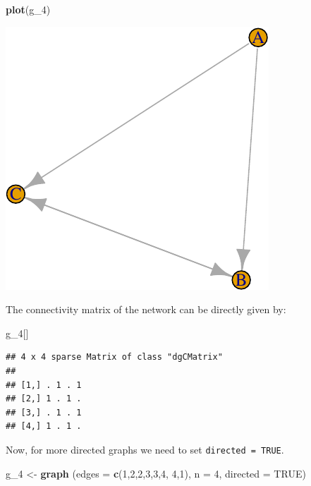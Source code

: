 \documentclass[]{article}
\newenvironment{Shaded}{\begin{snugshade}}{\end{snugshade}}
\newcommand{\KeywordTok}[1]{\textcolor[rgb]{0.13,0.29,0.53}{\textbf{{#1}}}}
\newcommand{\DataTypeTok}[1]{\textcolor[rgb]{0.13,0.29,0.53}{{#1}}}
\newcommand{\DecValTok}[1]{\textcolor[rgb]{0.00,0.00,0.81}{{#1}}}
\newcommand{\StringTok}[1]{\textcolor[rgb]{0.31,0.60,0.02}{{#1}}}
\newcommand{\OtherTok}[1]{\textcolor[rgb]{0.56,0.35,0.01}{{#1}}}
\newcommand{\NormalTok}[1]{{#1}}
\begin{document}
\begin{Shaded}
\begin{Highlighting}[]
\KeywordTok{plot}\NormalTok{(g_4)}
\end{Highlighting}
\end{Shaded}

\includegraphics{ResearchTools_files/figure-latex/unnamed-chunk-40-1.pdf}

The connectivity matrix of the network can be directly given by:

\begin{Shaded}
\begin{Highlighting}[]
\NormalTok{g_4[]}
\end{Highlighting}
\end{Shaded}

\begin{verbatim}
## 4 x 4 sparse Matrix of class "dgCMatrix"
##             
## [1,] . 1 . 1
## [2,] 1 . 1 .
## [3,] . 1 . 1
## [4,] 1 . 1 .
\end{verbatim}

Now, for more directed graphs we need to set \texttt{directed\ =\ TRUE}.

\begin{Shaded}
\begin{Highlighting}[]
\NormalTok{g_4 <-}\StringTok{ }\KeywordTok{graph} \NormalTok{(}\DataTypeTok{edges =} \KeywordTok{c}\NormalTok{(}\DecValTok{1}\NormalTok{,}\DecValTok{2}\NormalTok{,}\DecValTok{2}\NormalTok{,}\DecValTok{3}\NormalTok{,}\DecValTok{3}\NormalTok{,}\DecValTok{4}\NormalTok{, }\DecValTok{4}\NormalTok{,}\DecValTok{1}\NormalTok{), }\DataTypeTok{n =} \DecValTok{4}\NormalTok{, }\DataTypeTok{directed =} \OtherTok{TRUE}\NormalTok{)}
\end{Highlighting}
\end{Shaded}
\end{document}
